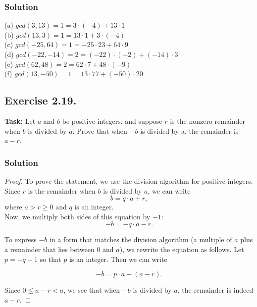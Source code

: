 \documentclass{article}
\begin{document}
\subsubsection*{Solution}

(a) $gcd(3,13)= 1 =3 \cdot (-4)+13 \cdot 1$\\
(b) $gcd(13,3)= 1 =13 \cdot 1+3 \cdot (-4)$\\
(c) $gcd(-25,64)= 1 =-25 \cdot 23+64 \cdot 9$\\
(d) $gcd(-22,-14)= 2 =(-22) \cdot (-2)+(-14) \cdot 3$\\
(e) $gcd(62,48)= 2 =62 \cdot 7+48 \cdot (-9)$\\
(f) $gcd(13,-50)= 1 =13 \cdot 77+(-50) \cdot 20$\\

\newpage

\subsection{Exercise 2.19.}
\textbf{Task:} Let $a$ and $b$ be positive integers, and suppose $r$ is the nonzero remainder when $b$ is divided by $a$. Prove that when $-b$ is divided by a, the remainder is $a-r$.

\subsubsection*{Solution}

\begin{proof}
    To prove the statement, we use the division algorithm for positive integers. \\

    Since $r$ is the remainder when $b$ is divided by $a$, we can write
    $$
    b = q \cdot a + r,
    $$
    where $a > r \geq 0$ and $q$ is an integer.\\

    Now, we multiply both sides of this equation by $-1$:
    $$
    -b = -q \cdot a - r.
    $$

    To express $-b$ in a form that matches the division algorithm (a multiple of $a$ plus a remainder that lies between $0$ and $a$), we rewrite the equation as follows. Let $p = -q - 1$ so that $p$ is an integer. Then we can write
    
    $$
    -b = p \cdot a + (a - r).
    $$

    Since $0 \leq a - r < a$, we see that when $-b$ is divided by $a$, the remainder is indeed $a - r$.
\end{proof}
\end{document}
